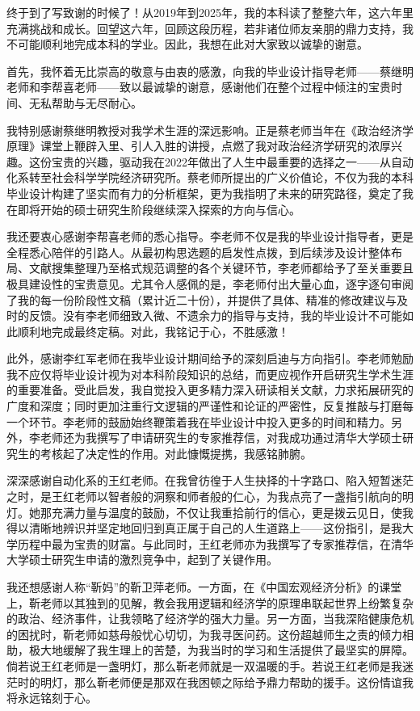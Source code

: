 
\begin{acknowledgements}

终于到了写致谢的时候了！从2019年到2025年，我的本科读了整整六年，这六年里充满挑战和成长。回望这六年，回顾这段历程，若非诸位师友亲朋的鼎力支持，我不可能顺利地完成本科的学业。因此，我想在此对大家致以诚挚的谢意。

​首先，我怀着无比崇高的敬意与由衷的感激，向我的毕业设计指导老师——蔡继明老师和李帮喜老师——致以最诚挚的谢意，感谢他们在整个过程中倾注的宝贵时间、无私帮助与无尽耐心。

我特别感谢蔡继明教授对我学术生涯的深远影响。正是蔡老师当年在《政治经济学原理》课堂上鞭辟入里、引人入胜的讲授，点燃了我对政治经济学研究的浓厚兴趣。这份宝贵的兴趣，驱动我在2022年做出了人生中最重要的选择之一——从自动化系转至社会科学学院经济研究所。蔡老师所提出的广义价值论，不仅为我的本科毕业设计构建了坚实而有力的分析框架，更为我指明了未来的研究路径，奠定了我在即将开始的硕士研究生阶段继续深入探索的方向与信心。

我还要衷心感谢李帮喜老师的悉心指导。李老师不仅是我的毕业设计指导者，更是全程悉心陪伴的引路人。从最初构思选题的启发性点拨，到后续涉及设计整体布局、文献搜集整理乃至格式规范调整的各个关键环节，李老师都给予了至关重要且极具建设性的宝贵意见。尤其令人感佩的是，李老师付出大量心血，逐字逐句审阅了我的每一份阶段性文稿（累计近二十份），并提供了具体、精准的修改建议与及时的反馈。没有李老师细致入微、不遗余力的指导与支持，我的毕业设计不可能如此顺利地完成最终定稿。对此，我铭记于心，不胜感激！​

此外，感谢李红军老师在我毕业设计期间给予的深刻启迪与方向指引。李老师勉励我不应仅将毕业设计视为对本科阶段知识的总结，而更应视作开启研究生学术生涯的重要准备。受此启发，我自觉投入更多精力深入研读相关文献，力求拓展研究的广度和深度；同时更加注重行文逻辑的严谨性和论证的严密性，反复推敲与打磨每一个环节。李老师的鼓励始终鞭策着我在毕业设计中投入更多的时间和精力。​另外，李老师还为我撰写了申请研究生的专家推荐信，对我成功通过清华大学硕士研究生的考核起了决定性的作用。对此慷慨提携，我感铭肺腑。

深深感谢自动化系的王红老师。在我曾彷徨于人生抉择的十字路口、陷入短暂迷茫之时，是王红老师以智者般的洞察和师者般的仁心，为我点亮了一盏指引航向的明灯。她那充满力量与温度的鼓励，不仅让我重拾前行的信心，更是拨云见日，使我得以清晰地辨识并坚定地回归到真正属于自己的人生道路上——这份指引，是我大学历程中最为宝贵的财富。与此同时，王红老师亦为我撰写了专家推荐信，在清华大学硕士研究生申请的激烈竞争中，起到了关键作用。

我还想感谢人称“靳妈”的靳卫萍老师。一方面，在《中国宏观经济分析》的课堂上，靳老师以其独到的见解，教会我用逻辑和经济学的原理串联起世界上纷繁复杂的政治、经济事件，让我领略了经济学的强大力量。另一方面，当我深陷健康危机的困扰时，靳老师如慈母般忧心切切，为我寻医问药。这份超越师生之责的倾力相助，极大地缓解了我生理上的苦楚，为我当时的学习和生活提供了最坚实的屏障。倘若说王红老师是一盏明灯，那么靳老师就是一双温暖的手。若说王红老师是我迷茫时的明灯，那么靳老师便是那双在我困顿之际给予鼎力帮助的援手。这份情谊我将永远铭刻于心。​


\end{acknowledgements}
